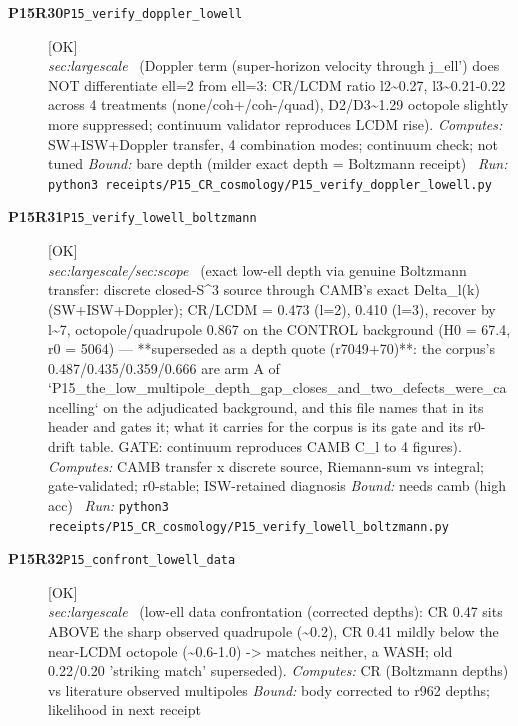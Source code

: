\begin{description}
\item[\textbf{P15R30}\quad\texttt{P15\_verify\_doppler\_lowell}]\hfill\textsf{[OK]}\\
\textit{sec:largescale} \ (Doppler term (super-horizon velocity through j\_ell') does NOT differentiate ell=2 from ell=3: CR/LCDM ratio l2\textasciitilde{}0.27, l3\textasciitilde{}0.21-0.22 across 4 treatments (none/coh+/coh-/quad), D2/D3\textasciitilde{}1.29 octopole slightly more suppressed; continuum validator reproduces LCDM rise). 
\emph{Computes:} SW+ISW+Doppler transfer, 4 combination modes; continuum check; not tuned
 \emph{Bound:} bare depth (milder exact depth = Boltzmann receipt)
\ \emph{Run:} \texttt{python3 receipts/P15\_CR\_cosmology/P15\_verify\_doppler\_lowell.py}
\item[\textbf{P15R31}\quad\texttt{P15\_verify\_lowell\_boltzmann}]\hfill\textsf{[OK]}\\
\textit{sec:largescale/sec:scope} \ (exact low-ell depth via genuine Boltzmann transfer: discrete closed-S\textasciicircum{}3 source through CAMB's exact Delta\_l(k) (SW+ISW+Doppler); CR/LCDM = 0.473 (l=2), 0.410 (l=3), recover by l\textasciitilde{}7, octopole/quadrupole 0.867 on the CONTROL background (H0 = 67.4, r0 = 5064) ---  **superseded as a depth quote (r7049+70)**: the corpus's 0.487/0.435/0.359/0.666 are arm A of `P15\_the\_low\_multipole\_depth\_gap\_closes\_and\_two\_defects\_were\_cancelling` on the adjudicated background, and this file names that in its header and gates it; what it carries for the corpus is its gate and its r0-drift table. GATE: continuum reproduces CAMB C\_l to 4 figures). 
\emph{Computes:} CAMB transfer x discrete source, Riemann-sum vs integral; gate-validated; r0-stable; ISW-retained diagnosis
 \emph{Bound:} needs camb (high acc)
\ \emph{Run:} \texttt{python3 receipts/P15\_CR\_cosmology/P15\_verify\_lowell\_boltzmann.py}
\item[\textbf{P15R32}\quad\texttt{P15\_confront\_lowell\_data}]\hfill\textsf{[OK]}\\
\textit{sec:largescale} \ (low-ell data confrontation (corrected depths): CR 0.47 sits ABOVE the sharp observed quadrupole (\textasciitilde{}0.2), CR 0.41 mildly below the near-LCDM octopole (\textasciitilde{}0.6-1.0) -> matches neither, a WASH; old 0.22/0.20 'striking match' superseded). 
\emph{Computes:} CR (Boltzmann depths) vs literature observed multipoles
 \emph{Bound:} body corrected to r962 depths; likelihood in next receipt

\end{description}
